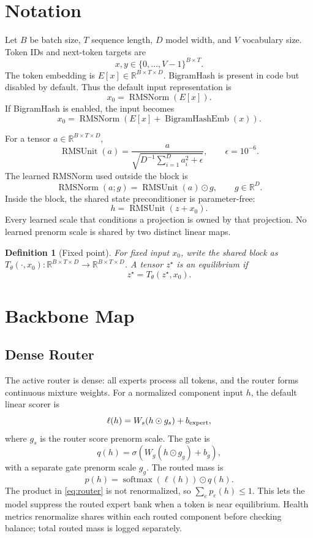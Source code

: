 \documentclass[11pt]{article}
\newtheorem{definition}[theorem]{Definition}
\newcommand{\R}{\mathbb{R}}
\newcommand{\softmax}{\operatorname{softmax}}
\newcommand{\RMSUnit}{\operatorname{RMSUnit}}
\newcommand{\RMSNorm}{\operatorname{RMSNorm}}
\begin{document}
\section{Notation}
\label{sec:notation}

Let $B$ be batch size, $T$ sequence length, $D$ model width, and $V$ vocabulary
size.  Token IDs and next-token targets are
\[
  x,y \in \{0,\ldots,V-1\}^{B\times T}.
\]
The token embedding is $E[x]\in\R^{B\times T\times D}$.  BigramHash is present
in code but disabled by default.  Thus the default input representation is
\[
  x_0 = \RMSNorm(E[x]).
\]
If BigramHash is enabled, the input becomes
\[
  x_0=\RMSNorm(E[x]+\operatorname{BigramHashEmb}(x)).
\]

For a tensor $a\in\R^{B\times T\times D}$,
\[
  \RMSUnit(a) = \frac{a}{\sqrt{D^{-1}\sum_{i=1}^D a_i^2+\epsilon}},
  \qquad \epsilon=10^{-6}.
\]
The learned RMSNorm used outside the block is
\[
  \RMSNorm(a;g)=\RMSUnit(a)\odot g,\qquad g\in\R^D.
\]
Inside the block, the shared state preconditioner is parameter-free:
\[
  h = \RMSUnit(z+x_0).
\]
Every learned scale that conditions a projection is owned by that projection.
No learned prenorm scale is shared by two distinct linear maps.

\begin{definition}[Fixed point]
For fixed input $x_0$, write the shared block as
$T_\theta(\cdot,x_0):\R^{B\times T\times D}\to\R^{B\times T\times D}$.
A tensor $z^\star$ is an equilibrium if
\[
  z^\star = T_\theta(z^\star,x_0).
\]
\end{definition}

\section{Backbone Map}
\label{sec:arch}

\subsection{Dense Router}
\label{sec:router}

The active router is dense: all experts process all tokens, and the router
forms continuous mixture weights.  For a normalized component input $h$, the
default linear scorer is
\[
  \ell(h) = W_s(h\odot g_s) + b_{\rm expert},
\]
where $g_s$ is the router score prenorm scale.  The gate is
\[
  q(h)=\sigma\!\left(W_g(h\odot g_g)+b_g\right),
\]
with a separate gate prenorm scale $g_g$.  The routed mass is
\begin{equation}
  p(h) = \softmax(\ell(h))\odot q(h).
  \label{eq:router}
\end{equation}
The product in \eqref{eq:router} is not renormalized, so
$\sum_e p_e(h)\le 1$.  This lets the model suppress the routed expert bank when
a token is near equilibrium.  Health metrics renormalize shares within each
routed component before checking balance; total routed mass is logged
separately.
\end{document}
